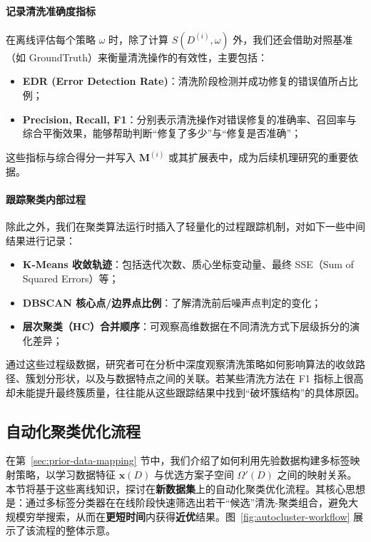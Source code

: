 \documentclass[10pt]{article} %
\numberwithin{equation}{section}
\begin{document}
\paragraph{记录清洗准确度指标}

在离线评估每个策略 $\omega$ 时，除了计算 $S(D^{(i)}, \omega)$ 外，我们还会借助对照基准（如 GroundTruth）来衡量清洗操作的有效性，主要包括：
\begin{itemize}
    \item \textbf{EDR (Error Detection Rate)}\cite{Ni2023}：清洗阶段检测并成功修复的错误值所占比例；
    \item \textbf{Precision, Recall, F1}：分别表示清洗操作对错误修复的准确率、召回率与综合平衡效果，能够帮助判断“修复了多少”与“修复是否准确”；
\end{itemize}
这些指标与综合得分一并写入 $\mathbf{M}^{(i)}$ 或其扩展表中，成为后续机理研究的重要依据。

\paragraph{跟踪聚类内部过程}

除此之外，我们在聚类算法运行时插入了轻量化的过程跟踪机制，对如下一些中间结果进行记录：
\begin{itemize}
    \item \textbf{K-Means 收敛轨迹}：包括迭代次数、质心坐标变动量、最终 SSE（Sum of Squared Errors）等；
    \item \textbf{DBSCAN 核心点/边界点比例}：了解清洗前后噪声点判定的变化；
    \item \textbf{层次聚类（HC）合并顺序}：可观察高维数据在不同清洗方式下层级拆分的演化差异；
\end{itemize}

通过这些过程级数据，研究者可在分析中深度观察清洗策略如何影响算法的收敛路径、簇划分形状，以及与数据特点之间的关联。若某些清洗方法在 F1 指标上很高却未能提升最终簇质量，往往能从这些跟踪结果中找到“破坏簇结构”的具体原因。

\subsection{自动化聚类优化流程}
\label{sec:autocluster-process}

在第~\ref{sec:prior-data-mapping} 节中，我们介绍了如何利用先验数据构建多标签映射策略，以学习数据特征 $\mathbf{x}(D)$ 与优选方案子空间 $\Omega'(D)$ 之间的映射关系。本节将基于这些离线知识，探讨在\textbf{新数据集}上的自动化聚类优化流程。其核心思想是：通过多标签分类器在在线阶段快速筛选出若干“候选”清洗-聚类组合，避免大规模穷举搜索，从而在\textbf{更短时间}内获得\textbf{近优}结果。图~\ref{fig:autocluster-workflow} 展示了该流程的整体示意。
\end{document}
